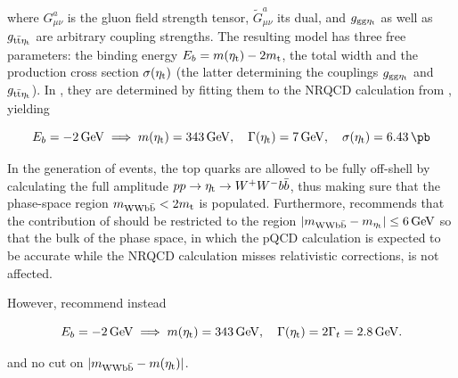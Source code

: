 \noindent where $G^{a}_{\mu \nu}$ is the gluon field strength tensor, $\tilde{G}^{a}_{\mu \nu}$ its dual, and $g_{\mathrm{gg} \mathrm{\eta_t}}$ as well as $g_{\mathrm{t \bar{t}} \mathrm{\eta_t}}$ are arbitrary coupling strengths. The resulting model has three free parameters: the binding energy $E_b = m(\mathrm{\eta_t}) - 2 m_{\mathrm{t}}$, the total width \Gammaetat and the production cross section $\sigma(\mathrm{\eta_t})$ (the latter determining the couplings $g_{\mathrm{gg} \mathrm{\eta_t}}$ and $g_{\mathrm{t \bar{t}} \mathrm{\eta_t}}$). In , they are determined by fitting them to the NRQCD calculation from , yielding

\begin{equation}
  \label{eq:theory:etatparams_7gev}
  E_b = \SI{-2}{\GeV} \implies \metat = \SI{343}{\GeV}, \quad \Gammaetat = \SI{7}{\GeV}, \quad \sigma(\etat) = \SI{6.43}{\pb}
\end{equation}

In the generation of events, the top quarks are allowed to be fully off-shell by calculating the full amplitude $p p \rightarrow \mathrm{\eta_t} \rightarrow W^+ W^- b \bar{b}$, thus making sure that the phase-space region $m_{\mathrm{WWb\bar{b}}} < 2 m_{\mathrm{t}}$ is populated. Furthermore,  recommends that the contribution of \etat should be restricted to the region $|m_{\mathrm{WWb\bar{b}}} - m_{\mathrm{\eta_t}}| \leq \SI{6}{GeV}$ so that the bulk of the \ttbar phase space, in which the pQCD calculation is expected to be accurate while the NRQCD calculation misses relativistic corrections, is not affected.

However,  recommend instead

\begin{equation}
  \label{eq:theory:etatparams_2p8gev}
  E_b = \SI{-2}{\GeV} \implies \metat = \SI{343}{\GeV}, \quad \Gammaetat = 2 \Gamma_{t} = \SI{2.8}{\GeV}.
\end{equation}

\noindent and no cut on $|m_{\mathrm{WWb\bar{b}}} - m(\mathrm{\eta_t})|$.

